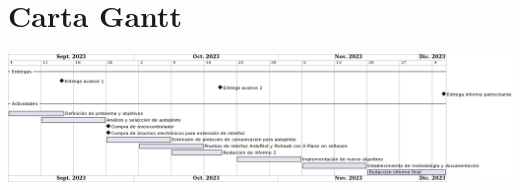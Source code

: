 \documentclass{report}
\begin{document}

\tableofcontents


\printbibliography
\appendix
\chapter{Carta Gantt}
\begin{center}
    \centering
    \includegraphics[width=\textwidth]{img/gantt.png}
\end{center}
\end{document}
